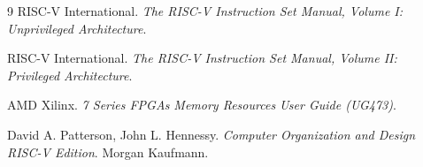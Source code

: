 \documentclass[UTF8,zihao=-4,a4paper]{ctexart}
\numberwithin{table}{section}
\numberwithin{figure}{section}
\begin{document}
\begin{thebibliography}{9}
  RISC-V International.
  \newblock \emph{The RISC-V Instruction Set Manual, Volume I: Unprivileged Architecture}.

  RISC-V International.
  \newblock \emph{The RISC-V Instruction Set Manual, Volume II: Privileged Architecture}.

  AMD Xilinx.
  \newblock \emph{7 Series FPGAs Memory Resources User Guide (UG473)}.

  David A. Patterson, John L. Hennessy.
  \newblock \emph{Computer Organization and Design RISC-V Edition}.
  \newblock Morgan Kaufmann.
\end{thebibliography}
\end{document}
